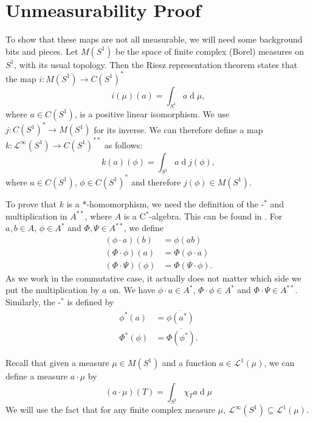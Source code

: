 \documentclass{article}
\newcommand{\blank}{\ensuremath{{\mbox{-}}}}
\newcommand{\Ell}{\mathcal{L}}
\renewcommand{\d}[1]{\operatorname{d}\!{#1}}
\begin{document}
\section{Unmeasurability Proof}
To show that these maps are not all measurable, we will need some background bits and pieces. Let $M(S^1)$ be the space of finite complex (Borel) measures on $S^1$, with its usual topology. Then the Riesz representation theorem states that the map $i : M(S^1) \rightarrow C(S^1)^*$
\[
i(\mu)(a) = \int_{S^1}a \d{\mu},
\]
where $a \in C(S^1)$, is a positive linear isomorphism. We use $j : C(S^1)^* \rightarrow M(S^1)$ for its inverse. We can therefore define a map $k : \Ell^\infty(S^1) \rightarrow C(S^1)^{**}$ as follows:
\[
k(a)(\phi) = \int_{S^1}a \d{j(\phi)},
\]
where $a \in C(S^1)$, $\phi \in C(S^1)^*$ and therefore $j(\phi) \in M(S^1)$. 

To prove that $k$ is a *-homomorphism, we need the definition of the $\blank^*$ and multiplication in $A^{**}$, where $A$ is a C$^*$-algebra. This can be found in \cite[\S 3.1]{dauns}. For $a,b \in A$, $\phi \in A^*$ and $\Phi,\Psi \in A^{**}$, we define
\begin{align*}
(\phi \cdot a)(b) &= \phi(ab) \\
(\Phi \cdot \phi)(a) &= \Phi(\phi \cdot a) \\
(\Phi \cdot \Psi)(\phi) &= \Phi(\Psi \cdot \phi).
\end{align*}
As we work in the commutative case, it actually does not matter which side we put the multiplication by $a$ on. We have $\phi \cdot a \in A^*$, $\Phi \cdot \phi \in A^*$ and $\Phi \cdot \Psi \in A^{**}$. 
Similarly, the $\blank^*$ is defined by
\begin{align*}
\phi^*(a) &= \overline{\phi(a^*)} \\
\Phi^*(\phi) &= \overline{\Phi(\phi^*)}.
\end{align*}

Recall that given a measure $\mu \in M(S^1)$ and a function $a \in \Ell^1(\mu)$, we can define a measure $a \cdot \mu$ by
\[
(a \cdot \mu)(T) = \int_{S^1}\chi_T a \d{\mu}
\]
We will use the fact that for any finite complex measure $\mu$, $\Ell^\infty(S^1) \subseteq \Ell^1(\mu)$. 
\end{document}
